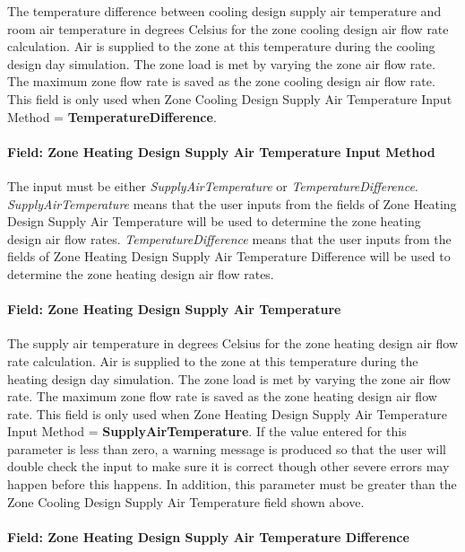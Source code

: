 The temperature difference between cooling design supply air temperature and room air temperature in degrees Celsius for the zone cooling design air flow rate calculation. Air is supplied to the zone at this temperature during the cooling design day simulation. The zone load is met by varying the zone air flow rate. The maximum zone flow rate is saved as the zone cooling design air flow rate. This field is only used when Zone Cooling Design Supply Air Temperature Input Method = \textbf{TemperatureDifference}.

\paragraph{Field: Zone Heating Design Supply Air Temperature Input Method}\label{field-zone-heating-design-supply-air-temperature-input-method}

The input must be either \emph{SupplyAirTemperature} or \emph{TemperatureDifference}. \emph{SupplyAirTemperature} means that the user inputs from the fields of Zone Heating Design Supply Air Temperature will be used to determine the zone heating design air flow rates. \emph{TemperatureDifference} means that the user inputs from the fields of Zone Heating Design Supply Air Temperature Difference will be used to determine the zone heating design air flow rates.

\paragraph{Field: Zone Heating Design Supply Air Temperature}\label{field-zone-heating-design-supply-air-temperature}

The supply air temperature in degrees Celsius for the zone heating design air flow rate calculation. Air is supplied to the zone at this temperature during the heating design day simulation. The zone load is met by varying the zone air flow rate. The maximum zone flow rate is saved as the zone heating design air flow rate. This field is only used when Zone Heating Design Supply Air Temperature Input Method = \textbf{SupplyAirTemperature}. If the value entered for this parameter is less than zero, a warning message is produced so that the user will double check the input to make sure it is correct though other severe errors may happen before this happens.  In addition, this parameter must be greater than the Zone Cooling Design Supply Air Temperature field shown above.


\paragraph{Field: Zone Heating Design Supply Air Temperature Difference}\label{field-zone-heating-design-supply-air-temperature-difference}

